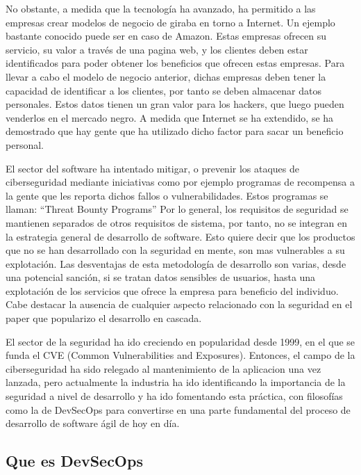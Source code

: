 \documentclass[12pt]{report} %
\begin{document}
No obstante, a medida que la tecnología ha avanzado, ha permitido a las empresas
crear modelos de negocio de giraba en torno a Internet.  Un ejemplo bastante
conocido puede ser en caso de Amazon.  Estas empresas ofrecen su servicio, su
valor a través de una pagina web, y los clientes deben estar identificados para
poder obtener los beneficios que ofrecen estas empresas.  Para llevar a cabo el
modelo de negocio anterior, dichas empresas deben tener la capacidad de
identificar a los clientes, por tanto se deben almacenar datos personales.
Estos datos tienen un gran valor para los hackers, que luego pueden venderlos en
el mercado negro.  A medida que Internet se ha extendido, se ha demostrado que
hay gente que ha utilizado dicho factor para sacar un beneficio personal.

El sector del software ha intentado mitigar, o prevenir los ataques de
ciberseguridad mediante iniciativas como por ejemplo programas de recompensa a
la gente que les reporta dichos fallos o vulnerabilidades.  Estos programas se
llaman: ``Threat Bounty Programs'' Por lo general, los requisitos de seguridad
se mantienen separados de otros requisitos de sistema, por tanto, no se integran
en la estrategia general de desarrollo de software. \cite{Flec2003} Esto quiere
decir que los productos que no se han desarrollado con la seguridad en mente,
son mas vulnerables a su explotación.  Las desventajas de esta metodología de
desarrollo son varias, desde una potencial sanción, si se tratan datos sensibles
de usuarios, hasta una explotación de los servicios que ofrece la empresa para
beneficio del individuo.  Cabe destacar la ausencia de cualquier aspecto
relacionado con la seguridad en el paper que popularizo el desarrollo en
cascada. \cite{royce1970}

El sector de la seguridad ha ido creciendo en popularidad desde 1999, en el que
se funda el CVE (Common Vulnerabilities and Exposures).  Entonces, el campo de
la ciberseguridad ha sido relegado al mantenimiento de la aplicacion una vez
lanzada, pero actualmente la industria ha ido identificando la importancia de la
seguridad a nivel de desarrollo y ha ido fomentando esta práctica, con
filosofías como la de DevSecOps para convertirse en una parte fundamental del
proceso de desarrollo de software ágil de hoy en día.

\subsection{Que es DevSecOps}
\end{document}
